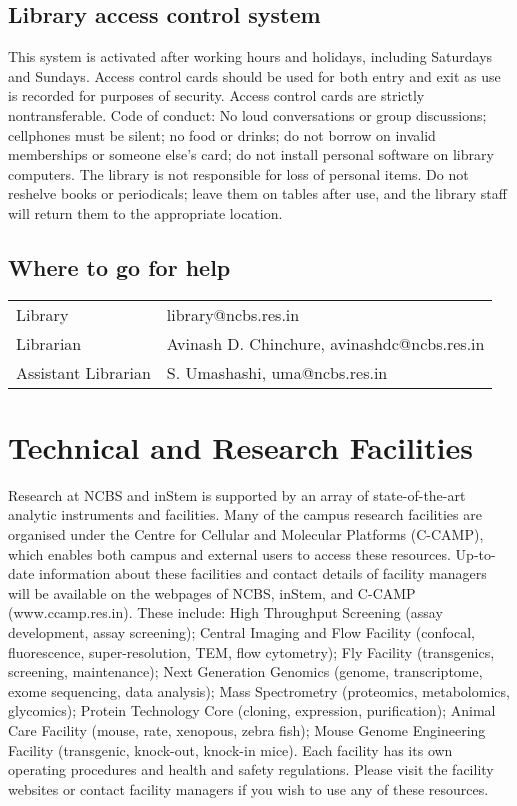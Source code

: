 \documentclass[a4paper]{extarticle}
\begin{document}
\subsection{Library access control system} This system is activated after
working hours and holidays, including Saturdays and Sundays. Access control
cards should be used for both entry and exit as use is recorded for purposes of
security. Access control cards are strictly nontransferable.  Code of conduct:
No loud conversations or group discussions; cellphones must be silent; no food
or drinks; do not borrow on invalid memberships or someone else’s card; do not
install personal software on library computers. The library is not responsible
for loss of personal items. Do not reshelve books or periodicals; leave them on
tables after use, and the library staff will return them to the appropriate
location.  

\subsection{Where to go for help} 
\begin{tabular}{l l}
Library & library@ncbs.res.in \\
Librarian & Avinash D. Chinchure, avinashdc@ncbs.res.in \\
Assistant Librarian & S. Umashashi, uma@ncbs.res.in
\end{tabular}

\section{Technical and Research Facilities}

Research at NCBS and inStem is supported by an array of state-of-the-art
analytic instruments and facilities. Many of the campus research facilities are
organised under the Centre for Cellular and Molecular Platforms (C-CAMP), which
enables both campus and external users to access these resources. Up-to-date
information about these facilities and contact details of facility managers will
be available on the webpages of NCBS, inStem, and C-CAMP (www.ccamp.res.in).
These include: High Throughput Screening (assay development, assay screening);
Central Imaging and Flow Facility (confocal, fluorescence, super-resolution,
TEM, flow cytometry); Fly Facility (transgenics, screening, maintenance); Next
Generation Genomics (genome, transcriptome, exome sequencing, data analysis);
Mass Spectrometry (proteomics, metabolomics, glycomics); Protein Technology Core
(cloning, expression, purification); Animal Care Facility (mouse, rate,
xenopous, zebra fish); Mouse Genome Engineering Facility (transgenic, knock-out,
knock-in mice). Each facility has its own operating procedures and health and
safety regulations. Please visit the facility websites or contact facility
managers if you wish to use any of these resources.
\end{document}
